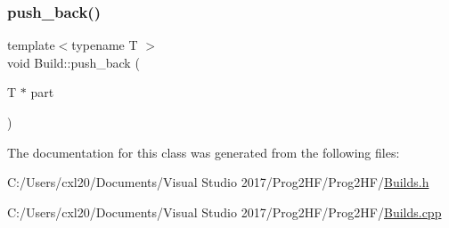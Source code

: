 \mbox{\label{class_build_aba0548391a8c613ed2a9d81d4d3b2a4b}} 
\subsubsection{\texorpdfstring{push\_back()}{push\_back()}}
{\footnotesize\ttfamily template$<$typename T $>$ \\
void Build\+::push\+\_\+back (\begin{DoxyParamCaption}\item[{T $\ast$}]{part }\end{DoxyParamCaption})}



The documentation for this class was generated from the following files\+:\begin{DoxyCompactItemize}
\item 
C\+:/\+Users/cxl20/\+Documents/\+Visual Studio 2017/\+Prog2\+H\+F/\+Prog2\+H\+F/\mbox{\hyperlink{_builds_8h}{Builds.\+h}}\item 
C\+:/\+Users/cxl20/\+Documents/\+Visual Studio 2017/\+Prog2\+H\+F/\+Prog2\+H\+F/\mbox{\hyperlink{_builds_8cpp}{Builds.\+cpp}}\end{DoxyCompactItemize}
